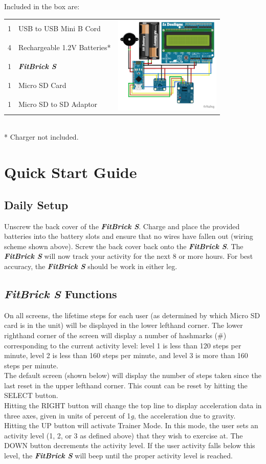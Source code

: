 \documentclass{article}
\begin{document}
Included in the box are:\\
\begin{tabular}{l l c}
	1 & USB to USB Mini B Cord & \multirow{5}{*}{\includegraphics[width=2.0in]{sketch_bb}}\\
	4 & Rechargeable 1.2V Batteries* & ~\\
	1 & \textbf{\textit{FitBrick S}} & ~\\
	1 & Micro SD Card  & ~ \\
	1 & Micro SD to SD Adaptor & ~
\end{tabular}
\\
* Charger not included.
\section{Quick Start Guide}
\subsection{Daily Setup}
Unscrew the back cover of the \textbf{\textit{FitBrick S}}. Charge and place the provided batteries into the battery slots and ensure that no wires have fallen out (wiring scheme shown above). Screw the back cover back onto the \textbf{\textit{FitBrick S}}. The \textbf{\textit{FitBrick S}} will now track your activity for the next 8 or more hours. For best accuracy, the \textbf{\textit{FitBrick S}} should be work in either leg.

\subsection{\textbf{\textit{FitBrick S}} Functions}
On all screens, the lifetime steps for each user (as determined by which Micro SD card is in the unit) will be displayed in the lower lefthand corner. The lower righthand corner of the screen will display a number of hashmarks (\#) corresponding to the current activity level: level 1 is less than 120 steps per minute, level 2 is less than 160 steps per minute, and level 3 is more than 160 steps per minute. \\
The default screen (shown below) will display the number of steps taken since the last reset in the upper lefthand corner. This count can be reset by hitting the SELECT button. \\
Hitting the RIGHT button will change the top line to display acceleration data in three axes, given in units of percent of 1\textit{g}, the acceleration due to gravity. \\
Hitting the UP button will activate Trainer Mode. In this mode, the user sets an activity level (1, 2, or 3 as defined above) that they wish to exercise at. The DOWN button decrements the activity level. If the user activity falls below this level, the \textbf{\textit{FitBrick S}} will beep until the proper activity level is reached. 
\end{document}
